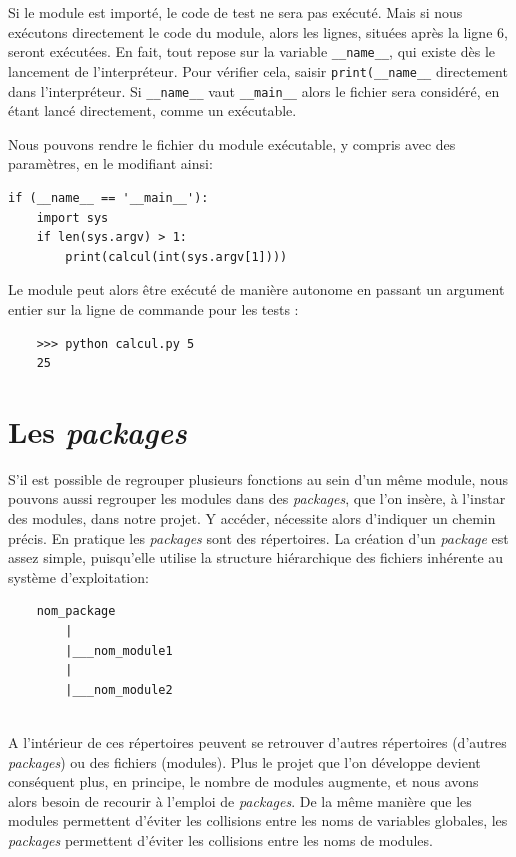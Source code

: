 \documentclass[a4paper,11pt]{book}
\begin{document}
Si le module est importé, le code de test ne sera pas exécuté. Mais si nous exécutons directement le code du module, alors les lignes, situées après la ligne 6, seront exécutées. En fait, tout repose sur la variable \texttt{\_\_name\_\_}, qui existe dès le lancement de l'interpréteur. Pour vérifier cela, saisir \texttt{print(\_\_name\_\_} directement dans l'interpréteur. Si \texttt{\_\_name\_\_} vaut \texttt{\_\_main\_\_} alors le fichier sera considéré, en étant lancé directement, comme un exécutable.
\medskip

Nous pouvons rendre le fichier du module exécutable, y compris avec des paramètres, en le modifiant ainsi:
\begin{lstlisting}[caption=Module \texttt{calcul.py} exécutable]
if (__name__ == '__main__'):
    import sys
    if len(sys.argv) > 1:
        print(calcul(int(sys.argv[1])))
\end{lstlisting}
\medskip

Le module peut alors être exécuté de manière autonome en passant un argument entier sur la ligne de commande pour les tests :
\begin{verbatim}
    >>> python calcul.py 5
    25
\end{verbatim}
\medskip

\section{Les \textit{packages}}
S'il est possible de regrouper plusieurs fonctions au sein d'un même module, nous pouvons aussi regrouper les modules dans des \textit{packages}, que l'on insère, à l'instar des modules, dans notre projet. Y accéder, nécessite alors d'indiquer un chemin précis. En pratique les \textit{packages} sont des répertoires. La création d'un \textit{package} est assez simple, puisqu'elle utilise la structure hiérarchique des fichiers inhérente au système d'exploitation:
\begin{verbatim}
    nom_package
        |
        |___nom_module1
        |
        |___nom_module2
        
\end{verbatim}
\medskip

A l'intérieur de ces répertoires peuvent se retrouver d'autres répertoires (d'autres \textit{packages}) ou des fichiers (modules). Plus le projet que l'on développe devient conséquent plus, en principe, le nombre de modules augmente, et nous avons alors besoin de recourir à l'emploi de \textit{packages}. De la même manière que les modules permettent d'éviter les collisions entre les noms de variables globales, les \textit{packages} permettent d'éviter les collisions entre les noms de modules.
\medskip
\end{document}
